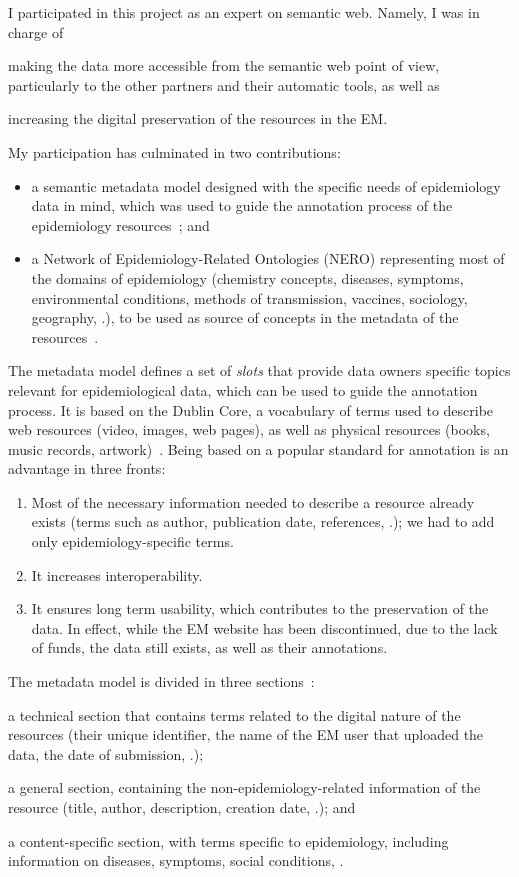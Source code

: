I participated in this project as an expert on semantic web. Namely, I was in charge of
\begin{paralist}
    \item making the data more accessible from the semantic web point of view, particularly to the other partners and their automatic tools, as well as
    \item increasing the digital preservation of the resources in the EM.
\end{paralist}
My participation has culminated in two contributions:
\begin{itemize}
    \item a semantic metadata model designed with the specific needs of epidemiology data in mind, which was used to guide the annotation process of the epidemiology resources~\citep{Couto2012}; and
    \item a Network of Epidemiology-Related Ontologies (NERO) representing most of the domains of epidemiology (chemistry concepts, diseases, symptoms, environmental conditions, methods of transmission, vaccines, sociology, geography, \etc.), to be used as source of concepts in the metadata of the resources~\citep{Ferreira2012}.
\end{itemize}

The metadata model defines a set of \emph{slots} that provide data owners specific topics relevant for epidemiological data, which can be used to guide the annotation process. It is based on the Dublin Core, a vocabulary of terms used to describe web resources (\eg video, images, web pages), as well as physical resources (\eg books, music records, artwork)~\citep{DCMI2012}. Being based on a popular standard for annotation is an advantage in three fronts:
\begin{enumerate}
    \item Most of the necessary information needed to describe a resource already exists (terms such as author, publication date, references, \etc.); we had to add only epidemiology-specific terms.
    \item It increases interoperability.
    \item It ensures long term usability, which contributes to the preservation of the data. In effect, while the EM website has been discontinued, due to the lack of funds, the data still exists, as well as their annotations.
\end{enumerate}

The metadata model is divided in three sections~\citep{Ferreira2013a}:
\begin{paralist}
    \item a technical section that contains terms related to the digital nature of the resources (their unique identifier, the name of the EM user that uploaded the data, the date of submission, \etc.);
    \item a general section, containing the non-epidemiology-related information of the resource (title, author, description, creation date, \etc.); and
    \item a content-specific section, with terms specific to epidemiology, including information on diseases, symptoms, social conditions, \etc.
\end{paralist}

